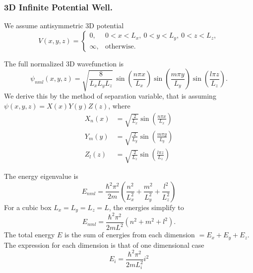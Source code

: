 \documentclass[../../../main.tex]{subfiles}
\begin{document}
\subsubsection{3D Infinite Potential Well.}
We assume antisymmetric 3D potential
\begin{equation*}
  V(x,y,z) =
  \begin{cases}
    0,      & 0 < x < L_x, \ 0 < y < L_y, \ 0 < z < L_z, \\
    \infty, & \text{otherwise}.
  \end{cases}
\end{equation*}

The full normalized 3D wavefunction is
\begin{equation*}
  \psi_{nml}(x,y,z) = \sqrt{\frac{8}{L_x L_y L_z}} \,
  \sin\left(\frac{n \pi x}{L_x}\right)
  \sin\left(\frac{m \pi y}{L_y}\right)
  \sin\left(\frac{l \pi z}{L_z}\right).
\end{equation*}
We derive this by the method of separation variable, that is assuming $\psi(x,y,z) = X(x) Y(y) Z(z)$, where
\begin{align*}
  X_n(x) & = \sqrt{\frac{2}{L_x}} \sin\left(\frac{n \pi x}{L_x}\right) \\
  Y_m(y) & = \sqrt{\frac{2}{L_y}} \sin\left(\frac{m \pi y}{L_y}\right) \\
  Z_l(z) & = \sqrt{\frac{2}{L_z}} \sin\left(\frac{l \pi z}{L_z}\right)
\end{align*}

The energy eigenvalue is
\begin{equation*}
  E_{nml} =\frac{\hbar^2 \pi^2}{2 m} \left( \frac{n^2}{L_x^2} + \frac{m^2}{L_y^2} + \frac{l^2}{L_z^2} \right)
\end{equation*}
For a cubic box \(L_x = L_y = L_z = L\), the energies simplify to
\begin{equation*}
  E_{nml} = \frac{\hbar^2 \pi^2}{2 m L^2} (n^2 + m^2 + l^2).
\end{equation*}
The total energy $E$ is the sum of energies from each dimension $= E_x + E_y + E_z$.
The expression for each dimension is that of one dimensional case
\begin{equation*}
  E_i=\frac{\hbar^2 \pi^2 }{2mL_i^2}i^2
\end{equation*}
\end{document}
